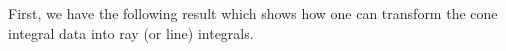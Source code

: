 \documentclass[a4paper,12pt]{amsart}
\numberwithin{equation}{section}
\theoremstyle{plain}
\numberwithin{theorem}{section}
\theoremstyle{definition}
\theoremstyle{remark}
\theoremstyle{remark}
\theoremstyle{remark}
\newcommand{\s}{\mathcal S}
\newcommand{\tred}[1]{{\color{red}#1}}
\newcommand{\vv}{{\mathbf{v}}}
\newcommand{\vx}{{\mathbf{x}}}
\newcommand{\jc}[1]{\begin{quotation}\textbf{James' comment:\
}{\textit{#1}}\end{quotation}}
\newcommand{\seanc}[1]{\begin{quotation}\textbf{Sean's comment:\
}{\textit{#1}}\end{quotation}}
\begin{document}



First, we have the following result which shows how one can transform the cone integral data into ray (or line) integrals.
\end{document}
